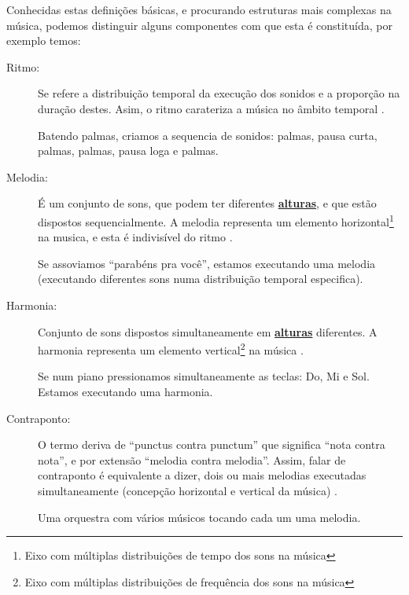 Conhecidas estas definições básicas, e procurando estruturas mais complexas na música,
podemos distinguir alguns componentes com que esta é constituída, 
por exemplo temos:

\begin{description}
\item [Ritmo:] \label{sec:pos:Ritmo}
Se refere a distribuição temporal da execução dos sonidos e a proporção na duração destes. 
Asim, o ritmo carateriza a música no âmbito temporal \cite[pp. 11]{medteoria}.
\begin{example}
Batendo palmas, criamos a sequencia de sonidos: palmas, pausa curta, palmas, palmas, pausa loga e palmas.
\end{example} 
\item [Melodia:] \label{sec:pos:Melodia}
É um conjunto de sons, que podem ter diferentes \hyperref[sec:pos:Altura]{\textbf{alturas}}, 
e que estão dispostos sequencialmente. 
A melodia representa um elemento horizontal\footnote{\label{eixohor}Eixo com múltiplas distribuições de tempo dos sons na música} na musica, 
e esta é indivisível do ritmo \cite[pp. 517]{apel1969harvard} \cite[pp. 11]{medteoria}.
\begin{example}
Se assoviamos ``parabéns pra você'', estamos executando uma melodia 
(executando diferentes sons numa distribuição temporal especifica).
\end{example} 
\item [Harmonia:] \label{sec:pos:Harmonia}
Conjunto de sons dispostos simultaneamente em \hyperref[sec:pos:Altura]{\textbf{alturas}} diferentes.
A harmonia representa um elemento vertical\footnote{\label{eixover}Eixo com múltiplas distribuições de frequência dos sons na música} na música \cite[pp. 371]{apel1969harvard} \cite[pp. 8]{cardoso1973curso} \cite[pp. 11]{medteoria}. 
\begin{example}
Se num piano pressionamos simultaneamente as teclas: Do, Mi e Sol. Estamos executando uma harmonia.
\end{example} 
\item [Contraponto:] \label{sec:pos:Contraponto}
O termo deriva de ``punctus contra punctum'' que significa ``nota contra nota'', 
e por extensão ``melodia contra melodia''. 
Assim, falar de contraponto é equivalente a dizer, dois ou mais melodias executadas simultaneamente  
(concepção horizontal e vertical da música)  \cite[pp. 208]{apel1969harvard} \cite[pp. 11]{medteoria}.
\begin{example}
Uma orquestra com vários músicos tocando cada um uma melodia.
\end{example} 
\end{description}


